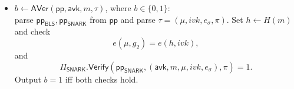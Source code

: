 \documentclass{article}
\newcommand{\ppBLS}[0]{\mathsf{pp}_{\mathsf{BLS}}}
\newcommand{\ppSNARK}[0]{\mathsf{pp}_{\mathsf{SNARK}}}
\newcommand{\pp}[0]{\mathsf{pp}}
\newcommand{\topic}[0]{\mathsf{topic}}
\begin{document}
\begin{itemize}
        \begin{equation}\label{R_agg}
        \mathcal{R}_{\mathsf{agg}}
        :=\Bigl\{(x,w)\ \Bigm|\ 
        \begin{aligned}
          &\ \forall \eta\in[t]:\ 
          \Pi_{\mathsf{MT}}.\mathsf{Check}(\mathsf{avk},(vk_{I_\eta},w_{I_\eta}),p_{I_\eta})=1\\
          &\land\ \Pi_{\mathsf{BLS}}.\mathsf{Ver}(\ppBLS,vk_{I_\eta},m.\topic,\sigma_{\topic,I_\eta})=1\\
          &\land\ \Pi_{\mathsf{BLS}}.\mathsf{Ver}(\ppBLS,vk_{I_\eta},m,\sigma_{I_\eta})=1\\
          &\land\ \mathsf{Eval}(\sigma_{\topic,I_\eta},j_\eta,m.\topic) < \bigl\lfloor \varphi(w_{I_\eta})\cdot 2^\lambda \bigr\rfloor\\
          &\land\ \mu=\prod_{\eta=1}^{t}\sigma_{I_\eta}^{\rho_\eta}\ \land\ ivk=\prod_{\eta=1}^{t}vk_{I_\eta}^{\rho_\eta}
        \end{aligned}
        \Bigr\}.
        \end{equation}

        
        
        Compute
        \[
          \pi \leftarrow \Pi_{\mathsf{SNARK}}.\mathsf{Prove}(\ppSNARK, x, w),
        \]
        and output
        \[
          \tau := (\mu, ivk, e_\sigma, \pi).
        \]

  \item $b \leftarrow \mathsf{AVer}(\pp,\mathsf{avk}, m, \tau)$, where $b\in\{0,1\}$:\\
        parse $\ppBLS,\ppSNARK$ from $\pp$ and parse $\tau=(\mu,ivk,e_\sigma,\pi)$. Set $h\leftarrow H(m)$ and check
        \[
          e(\mu,g_2)=e(h,ivk),
        \]
        and
        \[
          \Pi_{\mathsf{SNARK}}.\mathsf{Verify}(\ppSNARK, (\mathsf{avk},m,\mu,ivk,e_\sigma), \pi)=1.
        \]
        Output $b=1$ iff both checks hold.

\end{itemize}
\end{document}

